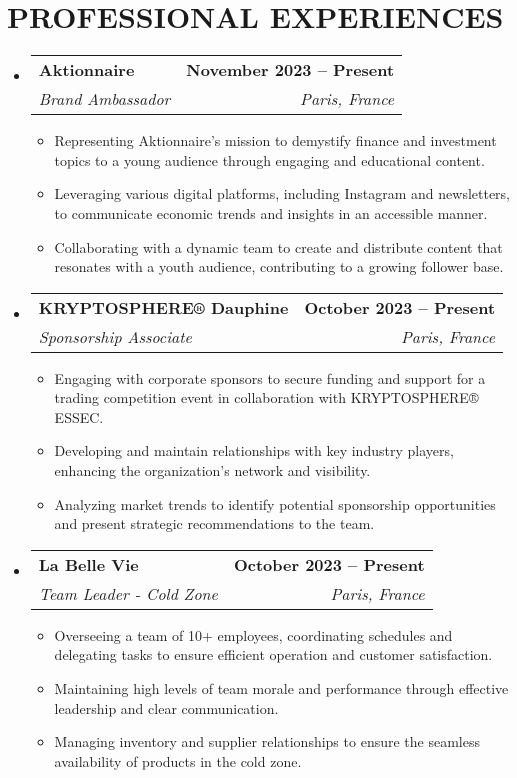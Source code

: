 \documentclass[letterpaper,11pt]{article}
\makeatletter
\newcommand{\resumeItem}[1]{
  \item\small{
    {#1 \vspace{-2pt}}
  }
}
\newcommand{\resumeSubheading}[4]{
  \vspace{-2pt}\item
    \begin{tabular*}{1.0\textwidth}[t]{l@{\extracolsep{\fill}}r}
      \textbf{#1} & \textbf{\small #2} \\
      \textit{\small#3} & \textit{\small #4} \\
    \end{tabular*}\vspace{-7pt}
}
\newcommand{\resumeSubHeadingListStart}{\begin{itemize}[leftmargin=0.0in, label={}]}
\newcommand{\resumeSubHeadingListEnd}{\end{itemize}}
\newcommand{\resumeItemListStart}{\begin{itemize}}
\newcommand{\resumeItemListEnd}{\end{itemize}\vspace{-5pt}}
\makeatother
\begin{document}
\section{PROFESSIONAL EXPERIENCES}
  \resumeSubHeadingListStart

    \resumeSubheading
  {Aktionnaire}{November 2023 -- Present}
  {Brand Ambassador}{Paris, France}
  \resumeItemListStart
    \resumeItem{Representing Aktionnaire’s mission to demystify finance and investment topics to a young audience through engaging and educational content.}
    \resumeItem{Leveraging various digital platforms, including Instagram and newsletters, to communicate economic trends and insights in an accessible manner.}
    \resumeItem{Collaborating with a dynamic team to create and distribute content that resonates with a youth audience, contributing to a growing follower base.}
  \resumeItemListEnd
    \resumeSubheading
      {KRYPTOSPHERE® Dauphine}{October 2023 -- Present}
      {Sponsorship Associate}{Paris, France}
      \resumeItemListStart
        \resumeItem{Engaging with corporate sponsors to secure funding and support for a trading competition event in collaboration with KRYPTOSPHERE® ESSEC.}
        \resumeItem{Developing and maintain relationships with key industry players, enhancing the organization's network and visibility.}
        \resumeItem{Analyzing market trends to identify potential sponsorship opportunities and present strategic recommendations to the team.}
      \resumeItemListEnd

    \resumeSubheading
  {La Belle Vie}{October 2023 -- Present}
  {Team Leader - Cold Zone}{Paris, France}
  \resumeItemListStart
    \resumeItem{Overseeing a team of 10+ employees, coordinating schedules and delegating tasks to ensure efficient operation and customer satisfaction.}
    \resumeItem{Maintaining high levels of team morale and performance through effective leadership and clear communication.}
    \resumeItem{Managing inventory and supplier relationships to ensure the seamless availability of products in the cold zone.}
  \resumeItemListEnd


    
      
    

  \resumeSubHeadingListEnd

\end{document}
